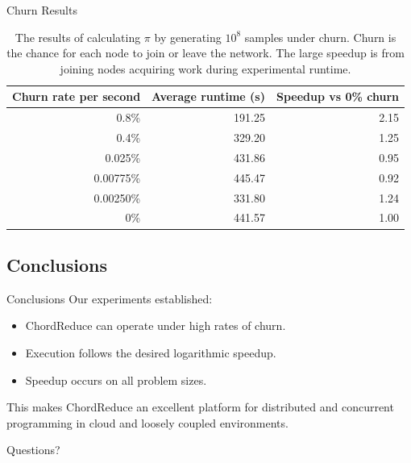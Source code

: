 \documentclass[11pt]{beamer}
\begin{document}
\begin{frame}{Churn Results}
\begin{table}
    \centering
    \begin{tabular}{|r|r|r|} 
        \hline 
        Churn rate per second & Average runtime (s) & Speedup vs 0\% churn\\ \hline{}
        0.8\% & 191.25 & 2.15 \\ \hline
        0.4\% & 329.20 & 1.25 \\ \hline
        0.025\% & 431.86 & 0.95 \\ \hline 
        0.00775\%  & 445.47 & 0.92 \\ \hline 
        0.00250\% & 331.80  &  1.24 \\ \hline 
        0\% & 441.57 & 1.00 \\ \hline
    \end{tabular}
    \caption{The results of calculating $\pi$ by generating $10^8$ samples under churn. Churn is the chance for each node to join or leave the network. The large speedup is from joining nodes acquiring work during experimental runtime.} 
    \label{churnSpeed}
\end{table}

\end{frame}




\subsection{Conclusions}

\begin{frame}{Conclusions}
Our experiments established:
\begin{itemize}
	\item ChordReduce can operate under high rates of churn.
	\item Execution follows the desired logarithmic speedup.
	\item Speedup occurs on all problem sizes.
\end{itemize}

This makes ChordReduce an excellent platform for distributed and concurrent programming in cloud and loosely coupled environments.

\end{frame}


\begin{frame}{}
Questions?
\end{frame}



\end{document}

